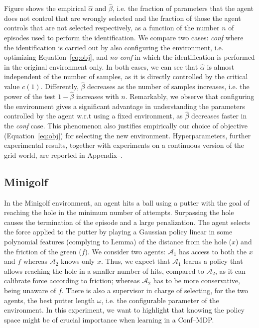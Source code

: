 \documentclass[letterpaper]{article} %
\begin{document}
Figure shows the empirical $\widehat{\alpha}$ and $\widehat{\beta}$, i.e. the fraction of parameters that the agent does not control that are wrongly selected and the fraction of those the agent controls that are not selected respectively, as a function of the number $n$ of episodes used to perform the identification. We compare two cases: \emph{conf} where the identification is carried out by also configuring the environment, i.e. optimizing Equation~\eqref{eq:obj}, and \emph{no-conf} in which the identification is performed in the original environment only. In both cases, we can see that $\widehat{\alpha}$ is almost  independent of the number of samples, as it is directly controlled by the critical value $c(1)$. Differently, $\widehat{\beta}$ decreases as the number of samples increases, i.e. the power of the test $1-\widehat{\beta}$ increases with $n$. Remarkably, we observe that configuring the environment gives a significant advantage in understanding the parameters controlled by the agent w.r.t using a fixed environment, as $\widehat{\beta}$ decreases faster in the \emph{conf} case. This phenomenon also justifies empirically our choice of objective (Equation~\eqref{eq:obj}) for selecting the new environment. Hyperparameters, further experimental results, together with experiments on a continuous version of the grid world, are reported in Appendix--.

\subsection{Minigolf}
In the Minigolf environment, an agent hits a ball using a putter with the goal of reaching the hole in the minimum number of attempts. Surpassing the hole causes the termination of the episode and a large penalization. The agent selects the force applied to the putter by playing a Gaussian policy linear in some polynomial features (complying to Lemma) of the distance from the hole ($x$) and the friction of the green ($f$). We consider two agents: $\mathscr{A}_1$ has access to both the $x$ and $f$ whereas $\mathscr{A}_2$ knows only $x$. Thus, we expect that $\mathscr{A}_1$ learns a policy that allows reaching the hole in a smaller number of hits, compared to $\mathscr{A}_2$, as it can calibrate force according to friction; whereas $\mathscr{A}_2$ has to be more conservative, being unaware of $f$. There is also a supervisor in charge of selecting, for the two agents, the best putter length $\omega$, i.e. the configurable parameter of the environment. In this experiment, we want to highlight that knowing the policy space might be of crucial importance when learning in a Conf--MDP.
\end{document}
